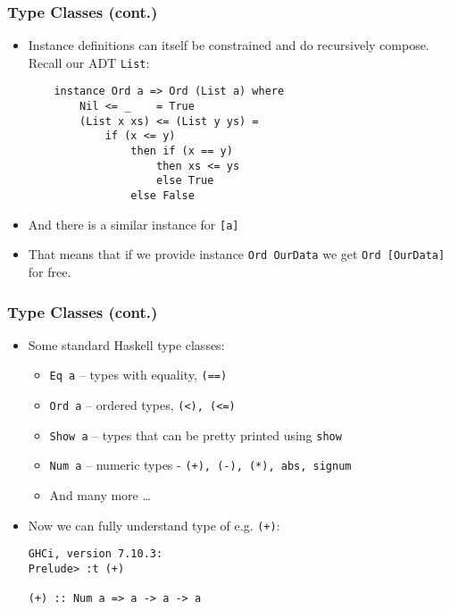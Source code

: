 \documentclass[final,handout]{beamer}
\begin{document}
\begin{frame}[fragile]
    \frametitle{Type Classes (cont.)}

    \begin{itemize}
        \item Instance definitions can itself be constrained and do recursively
            compose. Recall our ADT \texttt{List}:

           \begin{lstlisting}
    instance Ord a => Ord (List a) where
        Nil <= _    = True
        (List x xs) <= (List y ys) =
            if (x <= y) 
                then if (x == y) 
                    then xs <= ys
                    else True
                else False
           \end{lstlisting}

        \item<2-> And there is a similar instance for \texttt{[a]}
        \item<3-> That means that if we provide instance \texttt{Ord OurData} we get 
            \texttt{Ord [OurData]} for free.
    \end{itemize}
\end{frame}

\begin{frame}[fragile]
    \frametitle{Type Classes (cont.)}

    \begin{itemize}
        \item Some standard Haskell type classes:
            \begin{itemize}
                \item \texttt{Eq a} -- types with equality, \texttt{(==)}
                \item \texttt{Ord a} -- ordered types, \texttt{(<), (<=)}
                \item \texttt{Show a} -- types that can be pretty printed using
                    \texttt{show}
                \item \texttt{Num a} -- numeric types - \texttt{(+), (-), (*), abs,
                    signum}

                \item And many more \dots
            \end{itemize}

        \item<2-> Now we can fully understand type of e.g. \texttt{(+)}:

            \begin{verbatim}
GHCi, version 7.10.3: 
Prelude> :t (+)

(+) :: Num a => a -> a -> a
            \end{verbatim}
    \end{itemize}
\end{frame}
\end{document}
